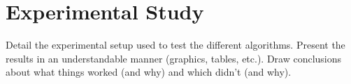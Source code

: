 
\section{Experimental Study} \label{sec:exp}

Detail the experimental setup used to test the different algorithms. Present the results in an understandable manner (graphics, tables, etc.). Draw conclusions about what things worked (and why) and which didn't (and why). 